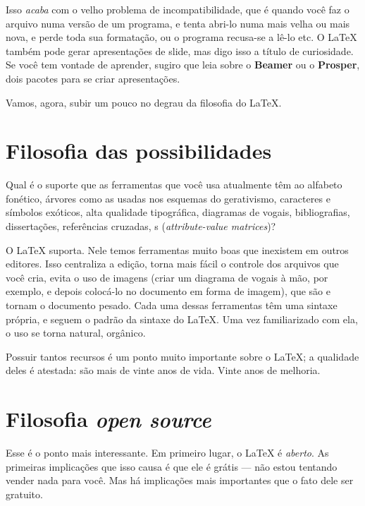 Isso \emph{acaba} com o velho problema de incompatibilidade, que é quando você faz o arquivo numa versão de um programa, e tenta abri-lo numa mais velha ou mais nova, e perde toda sua formatação, ou o programa recusa-se a lê-lo etc\@. O \LaTeX{} também pode gerar apresentações de slide, mas digo isso a título de curiosidade. Se você tem vontade de aprender, sugiro que leia sobre o \textbf{Beamer} ou o \textbf{Prosper}, dois pacotes para se criar apresentações.

Vamos, agora, subir um pouco no degrau da filosofia do \LaTeX{}.

\section{Filosofia das possibilidades}

Qual é o suporte que as ferramentas que você usa atualmente têm ao alfabeto fonético, árvores como as usadas nos esquemas do gerativismo, caracteres e símbolos exóticos, alta qualidade tipográfica, diagramas de vogais, bibliografias, dissertações, referências cruzadas, s (\emph{attribute-value matrices})?

O \LaTeX{} suporta. Nele temos ferramentas muito boas que inexistem em outros editores. Isso centraliza a edição, torna mais fácil o controle dos arquivos que você cria, evita o uso de imagens (criar um diagrama de vogais à mão, por exemplo, e depois colocá-lo no documento em forma de imagem), que são e tornam o documento pesado. Cada uma dessas ferramentas têm uma sintaxe própria, e seguem o padrão da sintaxe do \LaTeX. Uma vez familiarizado com ela, o uso se torna natural, orgânico.

Possuir tantos recursos é um ponto muito importante sobre o \LaTeX; a qualidade deles é atestada: são mais de vinte anos de vida. Vinte anos de melhoria.

\section{Filosofia \emph{open source}}

Esse é o ponto mais interessante. Em primeiro lugar, o \LaTeX{} é \emph{aberto}. As primeiras implicações que isso causa é que ele é grátis --- não estou tentando vender nada para você. Mas há implicações mais importantes que o fato dele ser gratuito.

